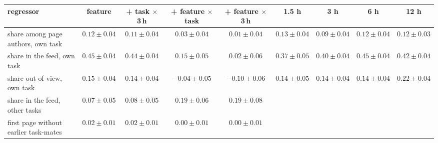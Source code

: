 \begin{tabular}{lcccccccc}
\toprule
regressor & feature & + task $\times$ 3\,h & + feature $\times$ task & + feature $\times$ 3\,h & 1.5 h & 3 h & 6 h & 12 h \\
\midrule
share among page authors, own task & $0.12 \pm 0.04$ & $0.11 \pm 0.04$ & $0.03 \pm 0.04$ & $0.01 \pm 0.04$ & $0.13 \pm 0.04$ & $0.09 \pm 0.04$ & $0.12 \pm 0.04$ & $0.12 \pm 0.03$ \\
share in the feed, own task & $0.45 \pm 0.04$ & $0.44 \pm 0.04$ & $0.15 \pm 0.05$ & $0.02 \pm 0.06$ & $0.37 \pm 0.05$ & $0.40 \pm 0.04$ & $0.45 \pm 0.04$ & $0.42 \pm 0.04$ \\
share out of view, own task & $0.15 \pm 0.04$ & $0.14 \pm 0.04$ & $-0.04 \pm 0.05$ & $-0.10 \pm 0.06$ & $0.14 \pm 0.05$ & $0.14 \pm 0.04$ & $0.14 \pm 0.04$ & $0.22 \pm 0.04$ \\
share in the feed, other tasks & $0.07 \pm 0.05$ & $0.08 \pm 0.05$ & $0.19 \pm 0.06$ & $0.19 \pm 0.08$ &  &  &  &  \\
first page without earlier task-mates & $0.02 \pm 0.01$ & $0.02 \pm 0.01$ & $0.00 \pm 0.01$ & $0.00 \pm 0.01$ &  &  &  &  \\
\bottomrule
\end{tabular}
